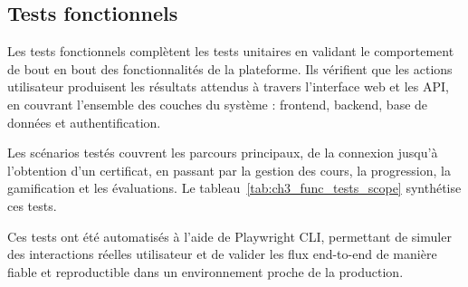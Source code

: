 \subsection{Tests fonctionnels}

Les tests fonctionnels complètent les tests unitaires en validant le comportement de bout en bout des fonctionnalités de la plateforme. Ils vérifient que les actions utilisateur produisent les résultats attendus à travers l'interface web et les API, en couvrant l'ensemble des couches du système : frontend, backend, base de données et authentification.

Les scénarios testés couvrent les parcours principaux, de la connexion jusqu'à l'obtention d'un certificat, en passant par la gestion des cours, la progression, la gamification et les évaluations. Le tableau~\ref{tab:ch3_func_tests_scope} synthétise ces tests.

Ces tests ont été automatisés à l'aide de Playwright CLI, permettant de simuler des interactions réelles utilisateur et de valider les flux end-to-end de manière fiable et reproductible dans un environnement proche de la production.

